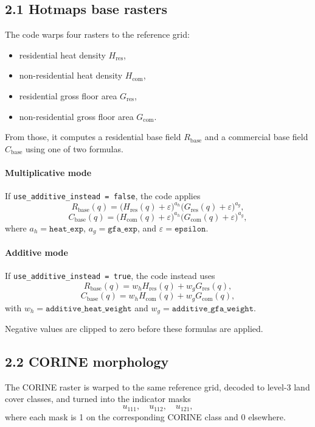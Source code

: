 \documentclass[11pt,a4paper]{article}
\newcommand{\eps}{\varepsilon}
\begin{document}
\subsection{2.1 Hotmaps base rasters}

The code warps four rasters to the reference grid:

\begin{itemize}[leftmargin=1.4em]
  \item residential heat density $H_{\mathrm{res}}$,
  \item non-residential heat density $H_{\mathrm{com}}$,
  \item residential gross floor area $G_{\mathrm{res}}$,
  \item non-residential gross floor area $G_{\mathrm{com}}$.
\end{itemize}

From those, it computes a residential base field $R_{\mathrm{base}}$ and a
commercial base field $C_{\mathrm{base}}$ using one of two formulas.

\paragraph{Multiplicative mode}
If \texttt{use\_additive\_instead = false}, the code applies
\[
R_{\mathrm{base}}(q) =
\bigl(H_{\mathrm{res}}(q)+\eps\bigr)^{a_h}
\bigl(G_{\mathrm{res}}(q)+\eps\bigr)^{a_g},
\]
\[
C_{\mathrm{base}}(q) =
\bigl(H_{\mathrm{com}}(q)+\eps\bigr)^{a_h}
\bigl(G_{\mathrm{com}}(q)+\eps\bigr)^{a_g},
\]
where $a_h=\texttt{heat\_exp}$, $a_g=\texttt{gfa\_exp}$, and
$\eps=\texttt{epsilon}$.

\paragraph{Additive mode}
If \texttt{use\_additive\_instead = true}, the code instead uses
\[
R_{\mathrm{base}}(q) = w_h H_{\mathrm{res}}(q) + w_g G_{\mathrm{res}}(q),
\]
\[
C_{\mathrm{base}}(q) = w_h H_{\mathrm{com}}(q) + w_g G_{\mathrm{com}}(q),
\]
with $w_h=\texttt{additive\_heat\_weight}$ and
$w_g=\texttt{additive\_gfa\_weight}$.

Negative values are clipped to zero before these formulas are applied.

\subsection{2.2 CORINE morphology}

The CORINE raster is warped to the same reference grid, decoded to level-3 land
cover classes, and turned into the indicator masks
\[
u_{111}, \quad u_{112}, \quad u_{121},
\]
where each mask is 1 on the corresponding CORINE class and 0 elsewhere.
\end{document}
